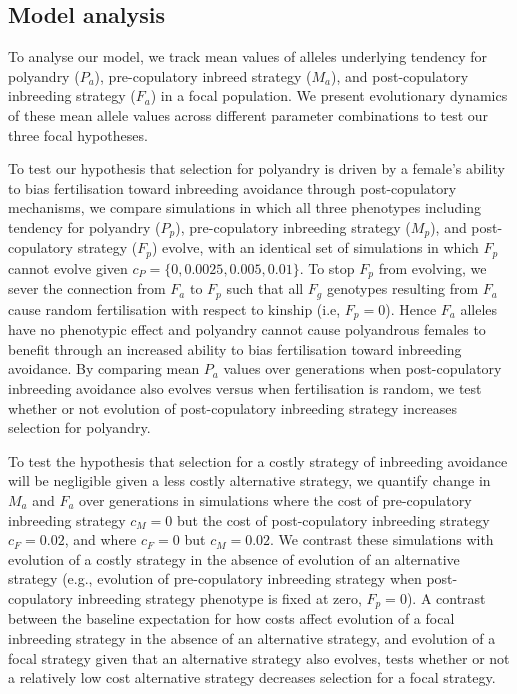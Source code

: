 \documentclass[10pt,letterpaper]{article}
\begin{document}
\subsection*{Model analysis}

To analyse our model, we track mean values of alleles underlying tendency for polyandry ($P_{a}$), pre-copulatory inbreed strategy ($M_{a}$), and post-copulatory inbreeding strategy ($F_{a}$) in a focal population. We present evolutionary dynamics of these mean allele values across different parameter combinations to test our three focal hypotheses. 

To test our hypothesis that selection for polyandry is driven by a female's ability to bias fertilisation toward inbreeding avoidance through post-copulatory mechanisms, we compare simulations in which all three phenotypes including tendency for polyandry ($P_{p}$), pre-copulatory inbreeding strategy ($M_{p}$), and post-copulatory strategy ($F_{p}$) evolve, with an identical set of simulations in which $F_{p}$ cannot evolve given $c_{P} = \{0, 0.0025, 0.005,  0.01\}$. To stop $F_{p}$ from evolving, we sever the connection from $F_{a}$ to $F_{p}$ such that all $F_{g}$ genotypes resulting from $F_{a}$ cause random fertilisation with respect to kinship (i.e, $F_{p}=0$). Hence $F_{a}$ alleles have no phenotypic effect and polyandry cannot cause polyandrous females to benefit through an increased ability to bias fertilisation toward inbreeding avoidance. By comparing mean $P_{a}$ values over generations when post-copulatory inbreeding avoidance also evolves versus when fertilisation is random, we test whether or not evolution of post-copulatory inbreeding strategy increases selection for polyandry.

To test the hypothesis that selection for a costly strategy of inbreeding avoidance will be negligible given a less costly alternative strategy, we quantify change in $M_{a}$ and $F_{a}$ over generations in simulations where the cost of pre-copulatory inbreeding strategy $c_{M}=0$ but the cost of post-copulatory inbreeding strategy $c_{F}=0.02$, and where $c_{F}=0$ but $c_{M}=0.02$. We contrast these simulations with evolution of a costly strategy in the absence of evolution of an alternative strategy (e.g., evolution of pre-copulatory inbreeding strategy when post-copulatory inbreeding strategy phenotype is fixed at zero, $F_{p}=0$). A contrast between the baseline expectation for how costs affect evolution of a focal inbreeding strategy in the absence of an alternative strategy, and evolution of a focal strategy given that an alternative strategy also evolves, tests whether or not a relatively low cost alternative strategy decreases selection for a focal strategy. 
\end{document}
